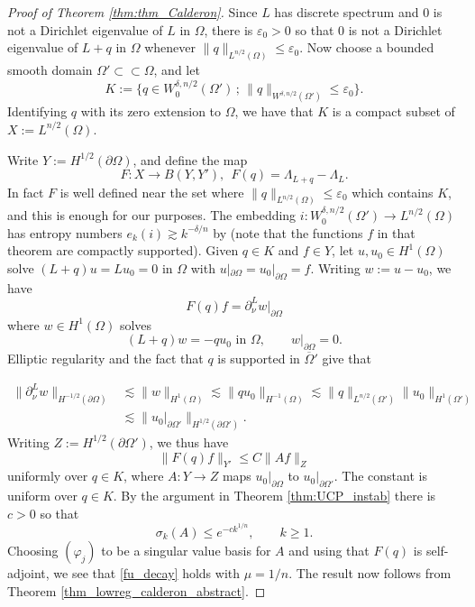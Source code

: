 \documentclass[12pt,twoside]{amsart}
\numberwithin{equation}{section}
\renewcommand{\leq}{\leqslant}
\renewcommand{\geq}{\geqslant}
\newcommand {\p} {\partial}
\newcommand{\norm}[1]{\lVert #1 \rVert}         %
\newcommand{\ol}[1]{\overline{#1}}
\newcommand{\eps}{\varepsilon}
\begin{document}
\begin{proof}[Proof of Theorem \ref{thm:thm_Calderon}]
Since $L$ has discrete spectrum and $0$ is not a Dirichlet eigenvalue of $L$ in $\Omega$, there is $\eps_0 > 0$ so that $0$ is not a Dirichlet eigenvalue of $L + q$ in $\Omega$ whenever $\norm{q}_{L^{n/2}(\Omega)} \leq \eps_0$. Now choose a bounded smooth domain $\Omega' \subset \subset \Omega$, and let 
\[
K := \{ q \in W^{\delta,n/2}_0(\Omega') \,;\, \norm{q}_{W^{\delta,n/2}(\Omega')} \leq \eps_0 \}.
\]
Identifying $q$ with its zero extension to $\Omega$, we have that $K$ is a compact subset of $X := L^{n/2}(\Omega)$.

Write $Y := H^{1/2}(\p \Omega)$, and define the map 
\[
F: X \to B(Y, Y'), \ \ F(q) = \Lambda_{L+q}-\Lambda_L.
\]
In fact $F$ is well defined near the set where $\norm{q}_{L^{n/2}(\Omega)} \leq \eps_0$ which contains $K$, and this is enough for our purposes. The embedding $i: W^{\delta,n/2}_0(\Omega') \to L^{n/2}(\Omega)$ has entropy numbers $e_k(i) \gtrsim k^{-\delta/n}$ by \cite[Theorem 1 in Section 3.3.3]{ET08} (note that the functions $f$ in that theorem are compactly supported). Given $q \in K$ and $f \in Y$, let $u, u_0 \in H^1(\Omega)$ solve $(L + q) u = L u_0 = 0$ in $\Omega$ with $u|_{\p \Omega} = u_0|_{\p \Omega} = f$. Writing $w := u-u_0$, we have 
\[
F(q) f = \p_{\nu}^{L} w|_{\p \Omega}
\]
where $w \in H^1(\Omega)$ solves 
\[
(L+q) w = -q u_0 \text{ in $\Omega$}, \qquad w|_{\p \Omega} = 0.
\]
Elliptic regularity and the fact that $q$ is supported in $\ol{\Omega}'$ give that 

\begin{align*}
\norm{\p_{\nu}^L w}_{H^{-1/2}(\p \Omega)} &\lesssim \norm{w}_{H^1(\Omega)} \lesssim \norm{qu_0}_{H^{-1}(\Omega)} \lesssim \norm{q}_{L^{n/2}(\Omega')} \norm{u_0}_{H^1(\Omega')} \\
 &\lesssim \norm{u_0|_{\p \Omega'}}_{H^{1/2}(\p \Omega')}.
\end{align*}
Writing $Z := H^{1/2}(\p \Omega')$, we thus have 
\[
\norm{F(q)f}_{Y'} \leq C \norm{Af}_{Z}
\]
uniformly over $q \in K$, where $A: Y \to Z$ maps $u_0|_{\p \Omega}$ to $u_0|_{\p \Omega'}$. 
The constant is uniform over $q \in K$. By the argument in Theorem \ref{thm:UCP_instab} there is $c > 0$ so that 
\[
\sigma_k(A) \leq e^{-c k^{1/n}}, \qquad k \geq 1.
\]
Choosing $(\varphi_j)$ to be a singular value basis for $A$ and using that $F(q)$ is self-adjoint, we see that \eqref{fu_decay} holds with $\mu = 1/n$. The result now follows from Theorem \ref{thm_lowreg_calderon_abstract}.
\end{proof}
\end{document}

